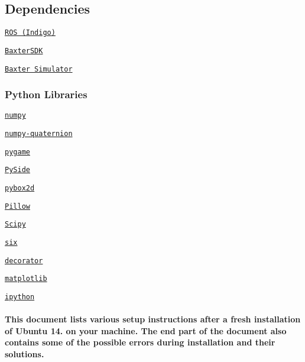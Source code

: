 \subsection*{Dependencies}


\begin{DoxyItemize}
\item \href{http://wiki.ros.org/indigo/Installation/Ubuntu}{\tt R\+OS (Indigo)}
\item \href{http://sdk.rethinkrobotics.com/wiki/Hello_Baxter}{\tt Baxter\+S\+DK}
\item \href{http://sdk.rethinkrobotics.com/wiki/Simulator_Installation}{\tt Baxter Simulator}
\end{DoxyItemize}

\subsubsection*{Python Libraries}


\begin{DoxyItemize}
\item \href{http://www.numpy.org/}{\tt numpy}
\item \href{https://pypi.python.org/pypi/numpy-quaternion}{\tt numpy-\/quaternion}
\item \href{http://www.pygame.org/download.shtml}{\tt pygame}
\item \href{https://pypi.python.org/pypi/PySide/1.2.4}{\tt Py\+Side}
\item \href{https://github.com/pybox2d/pybox2d}{\tt pybox2d}
\item \href{https://pypi.python.org/pypi/Pillow/4.1.1}{\tt Pillow}
\item \href{https://pypi.python.org/pypi/scipy/0.19.0}{\tt Scipy}
\item \href{https://pypi.python.org/pypi/six/1.10.0}{\tt six}
\item \href{https://pypi.python.org/pypi/decorator/4.0.11}{\tt decorator}
\item \href{https://pypi.python.org/pypi/matplotlib/2.0.1}{\tt matplotlib}
\item \href{https://pypi.python.org/pypi/ipython/6.0.0}{\tt ipython}
\end{DoxyItemize}

\paragraph*{This document lists various setup instructions after a fresh installation of Ubuntu 14. on your machine. The end part of the document also contains some of the possible errors during installation and their solutions.}


